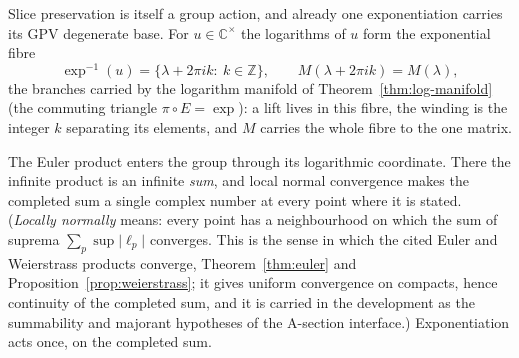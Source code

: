 \documentclass[11pt]{article}
\newcommand{\CC}{\mathbb{C}}
\newcommand{\ZZ}{\mathbb{Z}}
\theoremstyle{plain}
\theoremstyle{definition}
\theoremstyle{remark}
\begin{document}
Slice preservation is itself a group action, and already one exponentiation carries its
GPV degenerate base. For $u\in\CC^{\times}$ the logarithms of $u$ form the exponential fibre
\[
  \exp^{-1}(u)=\{\lambda+2\pi ik:\ k\in\ZZ\},\qquad
  M(\lambda+2\pi ik)=M(\lambda),
\]
the branches carried by the logarithm manifold of Theorem~\ref{thm:log-manifold} (the
commuting triangle $\pi\circ E=\exp$): a lift lives in this fibre, the winding is the
integer $k$ separating its elements, and $M$ carries the whole fibre to the one matrix.

The Euler product enters the group through its logarithmic coordinate.  There
the infinite product is an infinite \emph{sum}, and local normal
convergence makes the completed sum a single complex number at every point where it is
stated. (\emph{Locally normally} means: every point has a neighbourhood on which the sum of
suprema $\sum_p\sup\lvert\ell_p\rvert$ converges. This is the sense in which the cited Euler
and Weierstrass products converge, Theorem~\ref{thm:euler} and
Proposition~\ref{prop:weierstrass}; it gives uniform convergence on compacts, hence
continuity of the completed sum, and it is carried in the development as the summability and
majorant hypotheses of the A-section interface.) Exponentiation acts once, on the completed sum.
\end{document}
